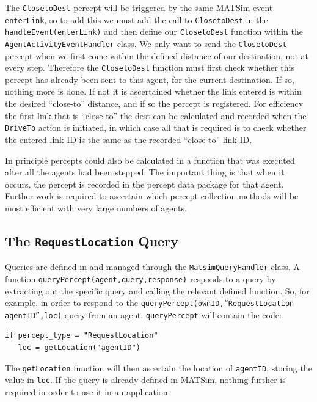 The \texttt{ClosetoDest} percept will be triggered by the same MATSim
event \texttt{enterLink}, so to add this we must add the call to
\texttt{ClosetoDest} in the \texttt{handleEvent(enterLink)} and then
  define our \texttt{ClosetoDest} function within the
  \texttt{AgentActivityEventHandler} class.  We only want to send the
  \texttt{ClosetoDest} percept when we first come within the defined
  distance of our destination, not at every step. Therefore the
  \texttt{ClosetoDest} function must first check whether this percept
  has already been sent to this agent, for the current destination. If
  so, nothing more is done. If not it is ascertained whether the link
  entered is within the desired ``close-to'' distance, and if so the
  percept is registered. For efficiency the first link that
    is ``close-to'' the dest can be calculated and recorded when the
    \texttt{DriveTo} action is initiated, in which case all that is required is
    to check whether the entered link-ID is the same as the recorded
    ``close-to'' link-ID.

In principle percepts could also be calculated in a function that was
executed after all the agents had been stepped. The important thing is
that when it occurs, the percept is recorded in the percept data
package for that agent. Further work is required to ascertain which
percept collection methods will be most efficient with very large
numbers of agents.

\subsection{The \texttt{RequestLocation} Query}
Queries are defined in and managed through the \texttt{MatsimQueryHandler}
class.
A function \texttt{queryPercept(agent,query,response)} responds to a query by
extracting out the specific query and calling the relevant defined
function. So, for example, in order to respond to the
\texttt{queryPercept(ownID,``RequestLocation agentID'',loc)} query from an
agent, \texttt{queryPercept} will contain the code:
\begin{verbatim}
if percept_type = "RequestLocation"
   loc = getLocation("agentID")
\end{verbatim}
The \texttt{getLocation} function will then ascertain the location of
\texttt{agentID}, storing the value in \texttt{loc}. 
%
If the query is already defined in MATSim, nothing further is required
in order to use it in an application.

